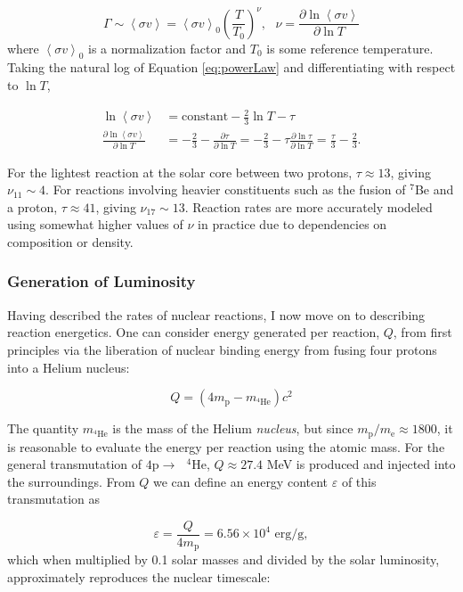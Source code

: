 \documentclass[12pt]{article}
\newcommand{\pderiv}[2]{\frac{\partial #1}{\partial #2}}
\newcommand{\bigparenthesis}[1]{\left(#1\right)}
\begin{document}
\begin{equation}
    \Gamma \sim \left<\sigma v \right> = \left<\sigma v \right>_0 \bigparenthesis{\frac{T}{T_0}}^\nu,\text{ } \nu = \pderiv{\ln \left<\sigma v \right>}{\ln T} \label{eq:powerLaw}
\end{equation}
%
where $\left<\sigma v \right>_0$ is a normalization factor and $T_0$ is some reference temperature. Taking the natural log of Equation \ref{eq:powerLaw} and differentiating with respect to $\ln T$,

\begin{align}
    \ln  \left<\sigma v \right> &= \text{constant} - \frac{2}{3}\ln T - \tau \\
    \pderiv{\ln \left<\sigma v \right>}{\ln T} &= -\frac{2}{3} - \pderiv{\tau}{\ln T} = -\frac{2}{3} - \tau\pderiv{\ln\tau}{\ln T} = \frac{\tau}{3} - \frac{2}{3}.
\end{align}

For the lightest reaction at the solar core between two protons, $\tau \approx 13$, giving $\nu_\mathrm{11} \sim 4$. For reactions involving heavier constituents such as the fusion of $^{7}$Be and a proton, $\tau \approx 41$, giving $\nu_\mathrm{17} \sim 13$. Reaction rates are more accurately modeled using somewhat higher values of $\nu$ in practice due to dependencies on composition or density.

\subsubsection{Generation of Luminosity}
Having described the rates of nuclear reactions, I now move on to describing reaction energetics. One can consider energy generated per reaction, $Q$, from first principles via the liberation of nuclear binding energy from fusing four protons into a Helium nucleus:


\begin{equation}
    Q = (4m_\mathrm{p} - m_{^{4}\mathrm{He}})c^2
\end{equation}


The quantity $m_{^4\mathrm{He}}$ is the mass of the Helium \textit{nucleus}, but since $m_\mathrm{p}/m_\mathrm{e} \approx 1800$, it is reasonable to evaluate the energy per reaction using the atomic mass. For the general transmutation of $4\text{p} \rightarrow\text{ } ^4\text{He}$, $Q \approx 27.4$ MeV is produced and injected into the surroundings. From $Q$ we can define an energy content $\varepsilon$ of this transmutation as


\begin{equation}
    \varepsilon = \frac{Q}{4 m_\mathrm{p}} = 6.56 \times 10^{4} \text{ erg/g},
\end{equation}
%
which when multiplied by 0.1 solar masses and divided by the solar luminosity, approximately reproduces the nuclear timescale:
\end{document}
